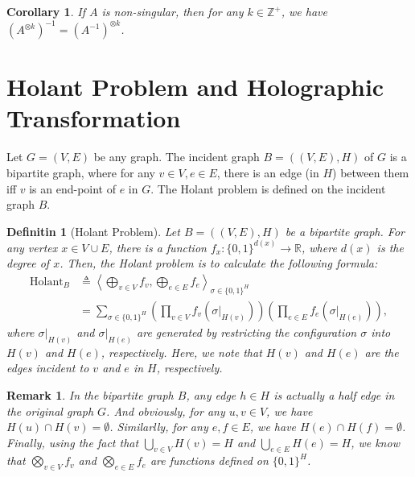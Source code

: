 \documentclass{article}
\newtheorem{definition}{Definitin}[section]
\newtheorem{corollary}{Corollary}[section]
\newtheorem{remark}{Remark}[section]
\def\<{\left\langle}
\def\>{\right\rangle}
\begin{document}
\begin{corollary}
  If $A$ is non-singular, then for any $k \in \mathbb{Z}^+$, we have $\left(A^{\otimes k}\right)^{-1} = \left(A^{-1}\right)^{\otimes k}$.
\end{corollary}

\section{Holant Problem and Holographic Transformation}
Let $G = (V, E)$ be any graph.
The incident graph $B = ((V, E), H)$ of $G$ is a bipartite graph, where for any $v\in V, e \in E$, there is an edge (in $H$) between them iff $v$ is an end-point of $e$ in $G$.
The Holant problem is defined on the incident graph $B$.

\begin{definition}[Holant Problem]
  Let $B = ((V, E), H)$ be a bipartite graph.
  For any vertex $x \in V\cup E$, there is a function $f_x: \{0, 1\}^{d(x)} \to \mathbb{R}$, where $d(x)$ is the degree of $x$.
  Then, the Holant problem is to calculate the following formula:
  \begin{align*}
    \mathrm{Holant}_B
    &\triangleq \<\bigoplus_{v\in V}f_v, \bigoplus_{e\in E} f_e\>_{\sigma \in \{0, 1\}^H} \\
    &= \sum_{\sigma \in \{0, 1\}^H} \left(\prod_{v\in V}f_v(\sigma |_{H(v)})\right) \left(\prod_{e\in E}f_e(\sigma |_{H(e)})\right),
  \end{align*}
  where $\sigma |_{H(v)}$ and $\sigma |_{H(e)}$ are generated by restricting the configuration $\sigma$ into $H(v)$ and $H(e)$, respectively.
  Here, we note that $H(v)$ and $H(e)$ are the edges incident to $v$ and $e$ in $H$, respectively.
\end{definition}

\begin{remark}
  In the bipartite graph $B$, any edge $h \in H$ is actually a half edge in the original graph $G$.
  And obviously, for any $u, v\in V$, we have $H(u) \cap H(v) = \emptyset$.
  Similarlly, for any $e, f \in E$, we have $H(e) \cap H(f) = \emptyset$.
  Finally, using the fact that $\bigcup_{v\in V}H(v) = H$ and $\bigcup_{e\in E}H(e) = H$, we know that $\bigotimes_{v\in V}f_v$ and $\bigotimes_{e\in E}f_e$ are functions defined on $\{0, 1\}^H$.
\end{remark}
\end{document}
